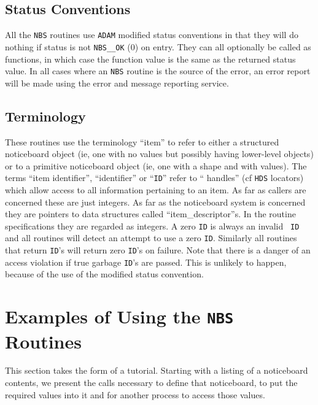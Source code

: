 \documentclass[twoside,11pt,nolof]{starlink}
\begin{document}
      \subsection {Status Conventions} All the \texttt{NBS} routines use {%
\tt ADAM} modified
      status conventions in that they will do nothing if status is not {%
\tt NBS\_\_OK}
      (0) on entry. They can all optionally be called as functions, in which
      case the function value is the same as the returned status value. In
      all cases where an \texttt{NBS} routine is the source of the error, an
      error report will be made using the error and message reporting service.

      \subsection {Terminology} These routines use the terminology ``item'' to
      refer to either a structured noticeboard object (ie, one with no values
      but possibly having lower-level objects) or to a primitive noticeboard
      object (ie, one with a shape and with values). The terms
      ``item identifier'', ``identifier'' or ``\texttt{ID}'' refer to ``%
handles'' (cf \texttt{HDS}
      locators) which allow access to all information pertaining to an item. As
      far as callers are concerned these are just integers. As far as the
      noticeboard system is concerned they are pointers to data structures
      called ``item\_descriptor''s. In the routine specifications they are
      regarded as integers. A zero {\texttt{ID}} is always an invalid {\texttt{%
ID}} and all routines
      will detect an attempt to use a zero {\texttt{ID}}. Similarly all %
routines that
      return {\texttt{ID}}'s will return zero {\texttt{ID}}'s on failure. Note %
that there is a danger
      of an access violation if true garbage {\texttt{ID}}'s are passed. This %
is unlikely
      to happen, because of the use of the modified status convention.


\section {Examples of Using the \texttt{NBS} Routines}

This section takes the form of a tutorial. Starting with a listing of a
noticeboard contents, we present the calls necessary to define that
noticeboard, to put the required values into it and for another process to
access those values.
\end{document}
